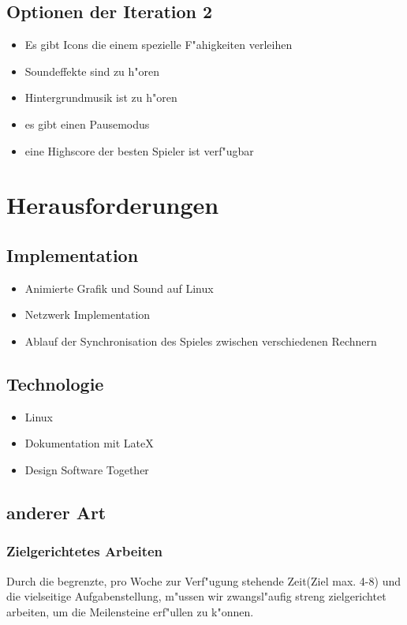\documentclass[10pt]{report}
\begin{document}
\section{Optionen der Iteration 2}
\begin{itemize}
\item Es gibt Icons die einem spezielle F"ahigkeiten verleihen
\item Soundeffekte sind zu h"oren
\item Hintergrundmusik ist zu h"oren
\item es gibt einen Pausemodus
\item eine Highscore der besten Spieler ist verf"ugbar
\end{itemize}

\chapter{Herausforderungen}
\section{Implementation}
\begin{itemize}{}{}
\item Animierte Grafik und Sound auf Linux
\item Netzwerk Implementation
\item Ablauf der Synchronisation des Spieles zwischen verschiedenen Rechnern
\end{itemize}

\section{Technologie}
\begin{itemize}{}{}
\item Linux
\item Dokumentation mit LateX
\item Design Software Together
\end{itemize}


\section{anderer Art}
\subsection{Zielgerichtetes Arbeiten}
Durch die begrenzte, pro Woche zur Verf"ugung stehende Zeit(Ziel max. 4-8) und die vielseitige
 Aufgabenstellung, m"ussen wir zwangsl"aufig streng zielgerichtet arbeiten, um die Meilensteine
 erf"ullen zu k"onnen.
\end{document}
